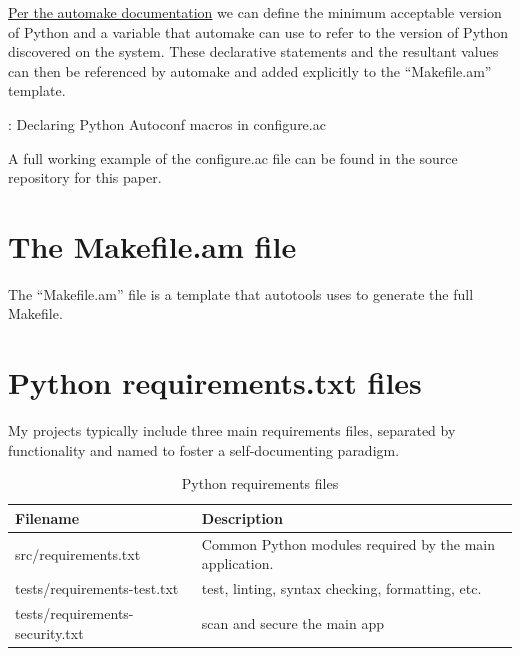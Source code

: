 \justifying
\href{https://www.gnu.org/software/automake/manual/html\_node/Python.html}{Per the automake documentation} we can define the minimum acceptable version of Python
and a variable that automake can use to refer to the version of Python discovered on the system. These declarative statements and the resultant values can then be
referenced by automake and added explicitly to the ``Makefile.am'' template.

\begin{mybox}{\thetcbcounter: Declaring Python Autoconf macros in configure.ac}
    
\end{mybox}
\vspace{2mm}

\justifying
A full working example of the configure.ac file can be found in the source repository for this paper.

\section{\label{sec:make}The Makefile.am file}

\justifying
The ``Makefile.am'' file is a template that autotools uses to generate the full Makefile.

\section{\label{sec:make}Python requirements.txt files}

\justifying
My projects typically include three main requirements files, separated by functionality and named to foster a self-documenting paradigm.

\begin{table}[ht]
    \centering
    \begin{tabular}{|l|l|}\hline
        Filename & Description \\\hline
        src/requirements.txt & Common Python modules required by the main application.    \\\hline
        tests/requirements-test.txt & test, linting, syntax checking, formatting, etc.    \\\hline
        tests/requirements-security.txt  &  scan and secure the main app   \\\hline
    \end{tabular}
    \caption{Python requirements files}
    \label{Requirements}
\end{table}

\clearpage
\begin{versionhistory}
\end{versionhistory}
\nocite{*}




